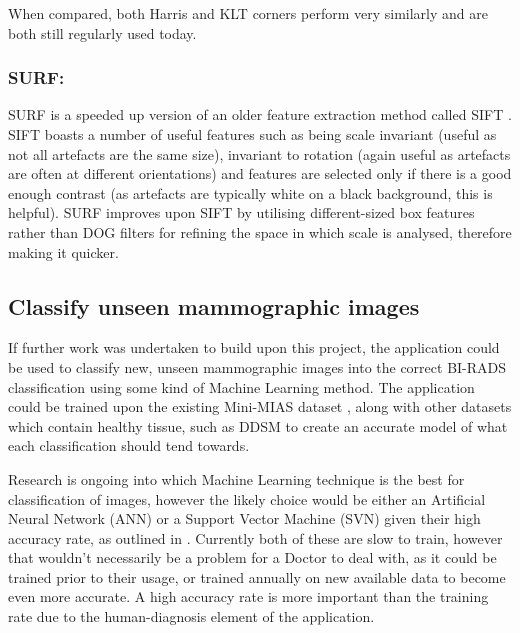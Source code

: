 When compared, both Harris and KLT corners perform very similarly and are both still regularly used today.

\subsubsection{SURF: } \acrfull{SURF} \cite{Bay_Tuytelaars_Gool_2006} is a speeded up version of an older feature extraction method called \acrfull{SIFT} \cite{Lowe_1999}. \acrshort{SIFT} boasts a number of useful features such as being scale invariant (useful as not all artefacts are the same size), invariant to rotation (again useful as artefacts are often at different orientations) and features are selected only if there is a good enough contrast (as artefacts are typically white on a black background, this is helpful). \acrshort{SURF} improves upon \acrshort{SIFT} by utilising different-sized box features rather than \acrfull{DOG} filters for refining the space in which scale is analysed, therefore making it quicker.

\subsection{Classify unseen mammographic images}

If further work was undertaken to build upon this project, the application could be used to classify new, unseen \gls{mammographic images} into the correct BI-RADS classification using some kind of Machine Learning method. The application could be trained upon the existing Mini-MIAS dataset \cite{Suckling_1994}, along with other datasets which contain healthy tissue, such as \acrshort{DDSM} \cite{Heath_Bowyer_Kopans_Moore_Kegelmeyer_Processing} \cite{Heath_Bowyer_Kopans_Kegelmeyer_Moore_Chang_MunishKumaran_1998} to create an accurate model of what each classification should tend towards.

Research is ongoing into which Machine Learning technique is the best for classification of images, however the likely choice would be either an Artificial Neural Network (ANN) or a Support Vector Machine (SVN) given their high accuracy rate, as outlined in \cite{kotsiantis2007supervised}. Currently both of these are slow to train, however that wouldn't necessarily be a problem for a Doctor to deal with, as it could be trained prior to their usage, or trained annually on new available data to become even more accurate. A high accuracy rate is more important than the training rate due to the human-diagnosis element of the application.


